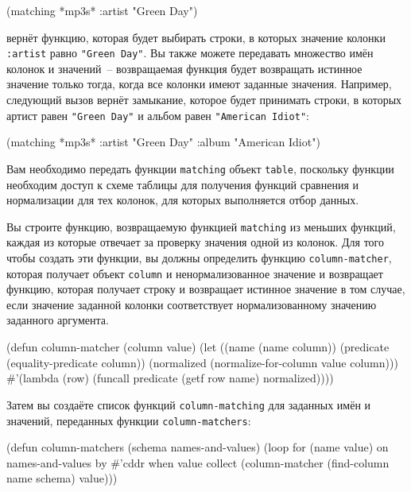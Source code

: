\begin{myverb}
(matching *mp3s* :artist "Green Day")
\end{myverb}

\noindent{}вернёт функцию, которая будет выбирать строки, в которых значение колонки \lstinline{:artist}
равно \lstinline{"Green Day"}.  Вы также можете передавать множество имён колонок и
значений~-- возвращаемая функция будет возвращать истинное значение только тогда, когда
все колонки имеют заданные значения.  Например, следующий вызов вернёт замыкание, которое
будет принимать строки, в которых артист равен \lstinline{"Green Day"} и альбом равен
\lstinline{"American Idiot"}:

\begin{myverb}
(matching *mp3s* :artist "Green Day" :album "American Idiot")
\end{myverb}

Вам необходимо передать функции \lstinline{matching} объект \lstinline{table}, поскольку функции
необходим доступ к схеме таблицы для получения функций сравнения и нормализации для тех
колонок, для которых выполняется отбор данных.

Вы строите функцию, возвращаемую функцией \lstinline{matching} из меньших функций, каждая из
которые отвечает за проверку значения одной из колонок.  Для того чтобы создать эти
функции, вы должны определить функцию \lstinline{column-matcher}, которая получает объект
\lstinline{column} и ненормализованное значение и возвращает функцию, которая получает строку
и возвращает истинное значение в том случае, если значение заданной колонки соответствует
нормализованному значению заданного аргумента.

\begin{myverb}
(defun column-matcher (column value)
  (let ((name (name column))
        (predicate (equality-predicate column))
        (normalized (normalize-for-column value column)))
    #'(lambda (row) (funcall predicate (getf row name) normalized))))
\end{myverb}

Затем вы создаёте список функций \lstinline{column-matching} для заданных имён и значений,
переданных функции \lstinline{column-matchers}:

\begin{myverb}
(defun column-matchers (schema names-and-values)
  (loop for (name value) on names-and-values by #'cddr
     when value collect
       (column-matcher (find-column name schema) value)))
\end{myverb}

